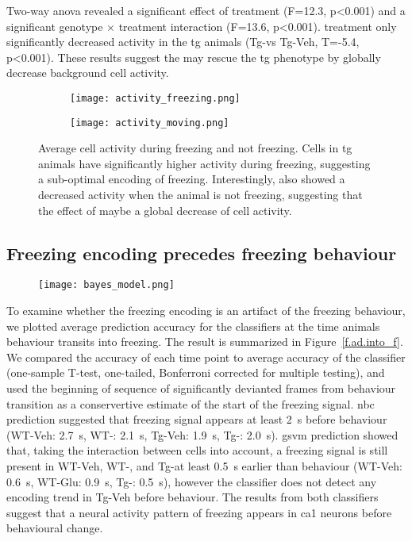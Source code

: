 Two-way \gls{anova} revealed a significant effect of treatment (F=12.3, p<0.001) and a significant genotype $\times$ treatment interaction (F=13.6, p<0.001). \tglu treatment only significantly decreased activity in the \gls{tg} animals (Tg-\glu vs Tg-Veh, T=-5.4, p<0.001). These results suggest the \tglu{} may rescue the \gls{tg} phenotype by globally decrease background cell activity.
\begin{figure}[h]
    \begin{subfigure}[h]{\textwidth}
        \texttt{[image: activity\_freezing.png]}
        \caption{\label{f.ad.actf}}
    \end{subfigure}
    \begin{subfigure}[h]{\textwidth}
        \texttt{[image: activity\_moving.png]}
        \caption{\label{f.ad.actnf}}
    \end{subfigure}
    \caption{Average cell activity during  freezing and  not freezing. Cells in \gls{tg} animals have significantly higher activity during freezing, suggesting a sub-optimal encoding of freezing. Interestingly, \tglu also showed a decreased activity when the animal is not freezing, suggesting that the effect of \tglu maybe a global decrease of cell activity. \label{f.ad.activity_freezing}}
\end{figure}

\subsection{Freezing encoding precedes freezing behaviour}



\begin{figure}[h]
    \texttt{[image: bayes\_model.png]}
    \caption{}
\end{figure}

To examine whether the freezing encoding is an artifact of the freezing behaviour, we plotted average prediction accuracy for the classifiers at the time animals behaviour transits into freezing. The result is summarized in Figure~\ref{f.ad.into_f}. We compared the accuracy of each time point to average accuracy of the classifier (one-sample T-test, one-tailed, Bonferroni corrected for multiple testing), and used the beginning of sequence of significantly devianted frames from behaviour transition as a conservertive estimate of the start of the freezing signal. \Gls{nbc} prediction suggested that freezing signal appears at least \SI{2}{\second} before behaviour (WT-Veh: \SI{2.7}{\second}, WT-\glu: \SI{2.1}{\second}, Tg-Veh: \SI{1.9}{\second}, Tg-\glu: \SI{2.0}{\second}). \Gls{gsvm} prediction showed that, taking the interaction between cells into account, a freezing signal is still present in WT-Veh, WT-\glu, and Tg-\glu at least \SI{0.5}{\second} earlier than behaviour (WT-Veh: \SI{0.6}{\second}, WT-Glu: \SI{0.9}{\second}, Tg-\glu: \SI{0.5}{\second}), however the classifier does not detect any encoding trend in Tg-Veh before behaviour. The results from both classifiers suggest that a neural activity pattern of freezing appears in \gls{ca1} neurons before behavioural change.

